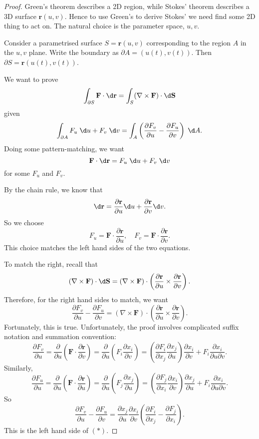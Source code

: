 \documentclass[a4paper]{article}
\begin{document}
\begin{proof}
  Green's theorem describes a 2D region, while Stokes' theorem describes a 3D surface $\mathbf{r}(u, v)$. Hence to use Green's to derive Stokes' we need find some 2D thing to act on. The natural choice is the parameter space, $u, v$.

  Consider a parametrised surface $S = \mathbf{r}(u, v)$ corresponding to the region $A$ in the $u, v$ plane. Write the boundary as $\partial A = (u(t), v(t))$. Then $\partial S = \mathbf{r}(u(t), v(t))$.

  We want to prove
  \[
    \int_{\partial S}\mathbf{F}\cdot \d \mathbf{r} = \int_S (\nabla \times \mathbf{F})\cdot \d \mathbf{S}
  \]
  given
  \[
    \int_{\partial A} F_u\;\d u + F_v\;\d v = \int_A\left(\frac{\partial F_v}{\partial u} - \frac{\partial F_u}{\partial v}\right)\;\d A.
  \]
  Doing some pattern-matching, we want
  \[
    \mathbf{F}\cdot \d \mathbf{r} = F_u \;\d u + F_v \;\d v
  \]
  for some $F_u$ and $F_v$.

  By the chain rule, we know that
  \[
    \d \mathbf{r} = \frac{\partial \mathbf{r}}{\partial u} \d u + \frac{\partial \mathbf{r}}{\partial v}\d v.
  \]
  So we choose
  \[
    F_u = \mathbf{F}\cdot \frac{\partial \mathbf{r}}{\partial u}, \quad F_v = \mathbf{F}\cdot\frac{\partial \mathbf{r}}{\partial v}.
  \]
  This choice matches the left hand sides of the two equations.

  To match the right, recall that
  \[
    (\nabla\times \mathbf{F}) \cdot \d \mathbf{S} = (\nabla\times \mathbf{F})\cdot \left(\frac{\partial \mathbf{r}}{\partial u}\times \frac{\partial \mathbf{r}}{\partial v}\right).
  \]
  Therefore, for the right hand sides to match, we want
  \[
    \frac{\partial F_v}{\partial u} - \frac{\partial F_u}{\partial v} = (\nabla\times \mathbf{F})\cdot \left(\frac{\partial \mathbf{r}}{\partial u}\times \frac{\partial \mathbf{r}}{\partial v}\right).\tag{$*$}
  \]
  Fortunately, this is true. Unfortunately, the proof involves complicated suffix notation and summation convention:
  \[
    \frac{\partial F_v}{\partial u} = \frac{\partial}{\partial u}\left(\mathbf{F}\cdot \frac{\partial \mathbf{r}}{\partial v}\right) = \frac{\partial}{\partial u}\left(F_i\frac{\partial x_i}{\partial v}\right) = \left(\frac{\partial F_i}{\partial x_j}\frac{\partial x_j}{\partial u}\right)\frac{\partial x_i}{\partial v} + F_i\frac{\partial x_i}{\partial u\partial v}.
  \]
  Similarly,
  \[
    \frac{\partial F_u}{\partial u} = \frac{\partial}{\partial u}\left(\mathbf{F}\cdot \frac{\partial \mathbf{r}}{\partial u}\right) = \frac{\partial}{\partial u}\left(F_j\frac{\partial x_j}{\partial u}\right) = \left(\frac{\partial F_j}{\partial x_i}\frac{\partial x_i}{\partial v}\right)\frac{\partial x_j}{\partial u} + F_i\frac{\partial x_i}{\partial u\partial v}.
  \]
  So
  \[
    \frac{\partial F_v}{\partial u} - \frac{\partial F_u}{\partial v} = \frac{\partial x_j}{\partial u}\frac{\partial x_i}{\partial v}\left(\frac{\partial F_i}{\partial x_j} - \frac{\partial F_j}{\partial x_i}\right).
  \]
  This is the left hand side of $(*)$.


\end{proof}
\end{document}
